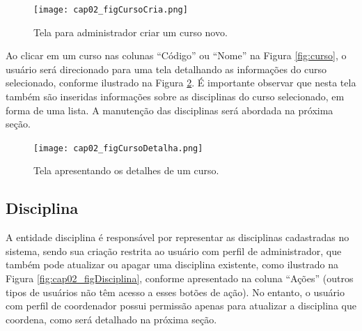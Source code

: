 \begin{figure}[!ht]
  \centering
  \texttt{[image: cap02\_figCursoCria.png]}
  \caption{Tela para administrador criar um curso novo.}
  \label{fig:cursoCria}
\end{figure}



Ao clicar em um curso nas colunas ``Código'' ou ``Nome'' na Figura \ref{fig:curso}, o usuário será direcionado para uma tela detalhando as informações do curso selecionado, conforme ilustrado na Figura \ref{fig:cap02_figCursoDetalha}. É importante observar que nesta tela também são inseridas informações sobre as disciplinas do curso selecionado, em forma de uma lista. A manutenção das disciplinas será abordada na próxima seção.

\begin{figure}[!ht]
  \centering
  \texttt{[image: cap02\_figCursoDetalha.png]}
  \caption{Tela apresentando os detalhes de um curso.}
  \label{fig:cap02_figCursoDetalha}
\end{figure}





\subsection{Disciplina}\label{sec:disciplina}

A entidade disciplina é responsável por representar as disciplinas cadastradas no sistema, sendo sua criação restrita ao usuário com perfil de administrador, que também pode atualizar ou apagar uma disciplina existente, como ilustrado na Figura \ref{fig:cap02_figDisciplina}, conforme apresentado na coluna ``Ações'' (outros tipos de usuários não têm acesso a esses botões de ação). No entanto, o usuário com perfil de coordenador possui permissão apenas para atualizar a disciplina que coordena, como será detalhado na próxima seção.

